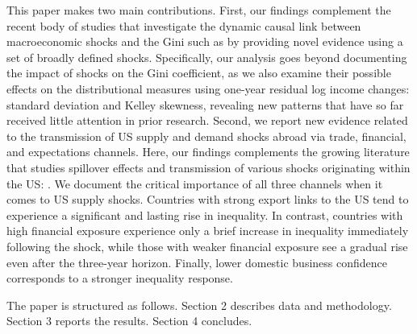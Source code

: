 \documentclass[12pt, a4paper]{article}
\begin{document}

This paper makes two main contributions. First, our findings complement the recent body of studies that investigate the dynamic causal link between macroeconomic shocks and the Gini such as \textcite{coibion2017innocent, Davtyan2017, furceri2018effects} by providing novel evidence using a set of broadly defined shocks. Specifically, our analysis goes beyond documenting the impact of shocks on the Gini coefficient, as we also examine their possible effects on the distributional measures using one-year residual log income changes: standard deviation and Kelley skewness, revealing new patterns that have so far received little attention in prior research. Second, we report new evidence related to the transmission of US supply and demand shocks abroad via trade, financial, and expectations channels. Here, our findings complements the growing literature that studies spillover effects and transmission of various shocks originating within the US: \textcite{akinci2013global, bowman2015us, fernandez2017world, schmitt2018important, di2022international, azad2022spillovers, lastauskas2023global, LASTAUSKAS2024101956}. We document the critical importance of all three channels when it comes to US supply shocks. Countries with strong export links to the US tend to experience a significant and lasting rise in inequality. In contrast, countries with high financial exposure experience only a brief increase in inequality immediately following the shock, while those with weaker financial exposure see a gradual rise even after the three-year horizon. Finally, lower domestic business confidence corresponds to a stronger inequality response.


The paper is structured as follows. Section 2 describes data and methodology. Section 3 reports the results. Section 4 concludes.
\end{document}
